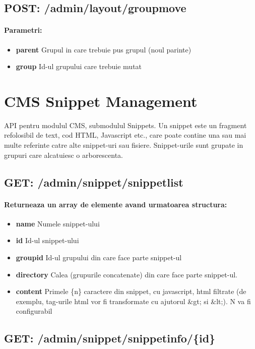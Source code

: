  \subsection*{POST: /admin/layout/groupmove}

\paragraph{Parametri:}
\begin{itemize}
\item \textbf{parent}
 Grupul in care trebuie pus grupul (noul parinte)
\item \textbf{group}
 Id-ul grupului care trebuie mutat
 \end{itemize}
 

\section{CMS Snippet Management}

API pentru modulul CMS, submodulul Snippets. Un snippet este un fragment refolosibil de text, cod HTML, Javascript etc., care poate contine una sau mai multe referinte catre alte snippet-uri sau fisiere. Snippet-urile sunt grupate in grupuri care alcatuiesc o arborescenta. \subsection*{GET: /admin/snippet/snippetlist}

\paragraph{Returneaza un array de elemente avand urmatoarea structura:}
\begin{itemize}
\item \textbf{name}
 Numele snippet-ului
\item \textbf{id}
 Id-ul snippet-ului
\item \textbf{groupid}
 Id-ul grupului din care face parte snippet-ul
\item \textbf{directory}
 Calea (grupurile concatenate) din care face parte snippet-ul.
\item \textbf{content}
 Primele \{n\} caractere din snippet, cu javascript, html filtrate (de exemplu, tag-urile html vor fi transformate cu ajutorul \&gt; si \&lt;). N va fi configurabil
 \end{itemize}
 \subsection*{GET: /admin/snippet/snippetinfo/\{id\}}


